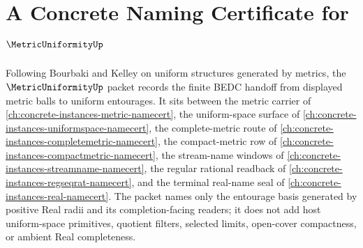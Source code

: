 \chapter{A Concrete Naming Certificate for $\MetricUniformityUp$}
\label{ch:concrete-instances-metric-uniformity-namecert}

Following Bourbaki and Kelley on uniform structures generated by metrics, the $\MetricUniformityUp$ packet records the finite BEDC handoff from displayed metric balls to uniform entourages. It sits between the metric carrier of \autoref{ch:concrete-instances-metric-namecert}, the uniform-space surface of \autoref{ch:concrete-instances-uniformspace-namecert}, the complete-metric route of \autoref{ch:concrete-instances-completemetric-namecert}, the compact-metric row of \autoref{ch:concrete-instances-compactmetric-namecert}, the stream-name windows of \autoref{ch:concrete-instances-streamname-namecert}, the regular rational readback of \autoref{ch:concrete-instances-regseqrat-namecert}, and the terminal real-name seal of \autoref{ch:concrete-instances-real-namecert}. The packet names only the entourage basis generated by positive Real radii and its completion-facing readers; it does not add host uniform-space primitives, quotient filters, selected limits, open-cover compactness, or ambient Real completeness.

